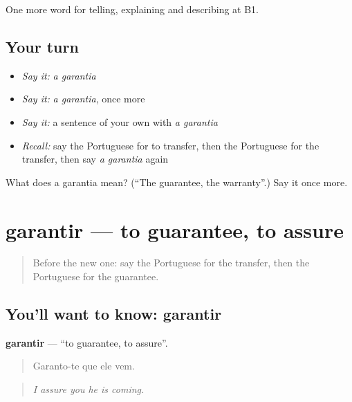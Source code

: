\begin{grammarlens}[title={What you've built}]
One more word for telling, explaining and describing at B1.
\end{grammarlens}

\subsection*{Your turn}
\begin{itemize}
\raggedright
  \item \emph{Say it:} \emph{a garantia}
  \item \emph{Say it:} \emph{a garantia}, once more
  \item \emph{Say it:} a sentence of your own with \emph{a garantia}
  \item \emph{Recall:} say the Portuguese for to transfer, then the Portuguese for the transfer, then say \emph{a garantia} again
\end{itemize}

\begin{tcolorbox}[breakable,colback=teal!4,colframe=teal!35!black,title={Before you move on}]
What does a garantia mean? (\textquotedblleft{}The guarantee, the warranty\textquotedblright{}.) Say it once more.
\end{tcolorbox}
\section[garantir]{garantir — to guarantee, to assure}

\label{lesson:PT-C394-garantir}



\begin{quote}
Before the new one: say the Portuguese for the transfer, then the Portuguese for the guarantee.
\end{quote}

\subsection*{You'll want to know: garantir}
\textbf{garantir} — \textquotedblleft{}to guarantee, to assure\textquotedblright{}.

\begin{quote}
Garanto-te que ele vem.
\end{quote}

\begin{quote}
\emph{I assure you he is coming.}
\end{quote}

